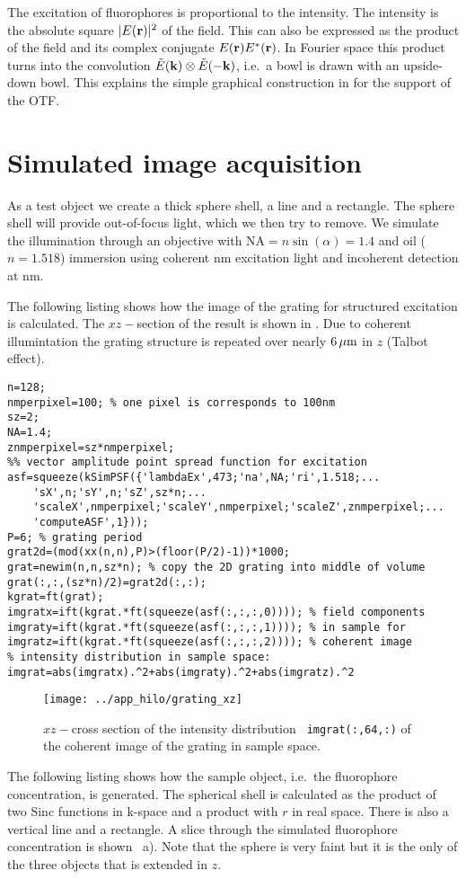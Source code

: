 The excitation of fluorophores is proportional to the intensity.  The
intensity is the absolute square $\mathopen| E(\mathbf{r}) \mathclose|^2$ of the field. This
can also be expressed as the product of the field and its complex
conjugate $E(\mathbf{r})E^*(\mathbf{r})$. In Fourier space this product turns into the
convolution $\tilde E(\mathbf{k})\otimes\tilde E(-\mathbf{k})$, i.e.\ a bowl is drawn
with an upside-down bowl. This explains the simple graphical
construction in  for the support of the OTF.

\section{Simulated image acquisition}
As a test object we create a thick sphere shell, a line and a
rectangle. The sphere shell will provide out-of-focus light, which we
then try to remove. We simulate the illumination through an objective
with $\textrm{NA}=n\sin(\alpha)=1.4$ and oil ($n=1.518$) immersion
using coherent \unit[473]{nm} excitation light and incoherent
detection at \unit[520]{nm}.

The following listing shows how the image of the grating for
structured excitation is calculated. The $xz-$section of the result is
shown in . Due to coherent illumintation the
grating structure is repeated over nearly $\unit[6]{\mu m}$ in $z$
(Talbot effect).
\begin{lstlisting}
n=128;
nmperpixel=100; % one pixel is corresponds to 100nm
sz=2;
NA=1.4;
znmperpixel=sz*nmperpixel;
%% vector amplitude point spread function for excitation
asf=squeeze(kSimPSF({'lambdaEx',473;'na',NA;'ri',1.518;...
    'sX',n;'sY',n;'sZ',sz*n;...
    'scaleX',nmperpixel;'scaleY',nmperpixel;'scaleZ',znmperpixel;...
    'computeASF',1}));
P=6; % grating period
grat2d=(mod(xx(n,n),P)>(floor(P/2)-1))*1000;
grat=newim(n,n,sz*n); % copy the 2D grating into middle of volume
grat(:,:,(sz*n)/2)=grat2d(:,:);
kgrat=ft(grat);
imgratx=ift(kgrat.*ft(squeeze(asf(:,:,:,0)))); % field components
imgraty=ift(kgrat.*ft(squeeze(asf(:,:,:,1)))); % in sample for
imgratz=ift(kgrat.*ft(squeeze(asf(:,:,:,2)))); % coherent image
% intensity distribution in sample space:
imgrat=abs(imgratx).^2+abs(imgraty).^2+abs(imgratz).^2
\end{lstlisting}
\begin{figure}[htb]
  \centering
  \texttt{[image: ../app\_hilo/grating\_xz]}
  \caption{$xz-$cross section of the intensity distribution {\tt
      imgrat(:,64,:)} of the coherent image of the grating in sample
    space.}
  \label{fig:grating}
\end{figure}
The following listing shows how the sample object, i.e.\ the
fluorophore concentration, is generated.  The spherical shell is
calculated as the product of two Sinc functions in k-space and a
product with $r$ in real space. There is also a vertical line and a
rectangle. A slice through the simulated fluorophore concentration is
shown ~a). Note that the sphere is very faint but
it is the only of the three objects that is extended in $z$.

